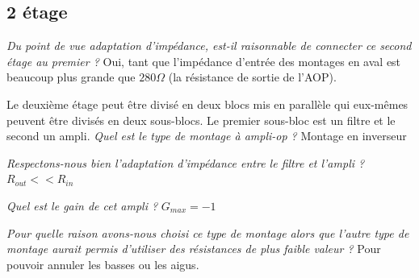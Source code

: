 \subsection{2 étage}

{
\textit{Du point de vue adaptation d'impédance, est-il raisonnable de connecter ce second étage au premier ?}
}
{%
Oui, tant que l'impédance d'entrée des montages en aval est beaucoup plus grande que $280\Omega$ (la résistance de sortie de l'AOP).
}

Le deuxième étage peut être divisé en deux blocs mis en parallèle qui eux-mêmes peuvent être divisés en deux sous-blocs. Le premier sous-bloc est un filtre et le second un ampli.
{
\textit{Quel est le type de montage à ampli-op ?}
}
{%
Montage en inverseur
}

{
\textit{Respectons-nous bien l'adaptation d'impédance entre le filtre et l'ampli ?}
}
{%
$R_{out} << R_{in}$
}

{
\textit{Quel est le gain de cet ampli ?}
}
{%
$G_{max} = -1$
}

{
\textit{Pour quelle raison avons-nous choisi ce type de montage alors que l'autre type de montage aurait permis d'utiliser des résistances de plus faible valeur ?}
}
{%
Pour pouvoir annuler les basses ou les aigus.
}

